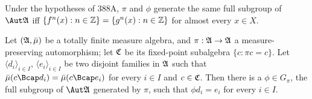      
Under the hypotheses of 388A, $\pi$ and $\phi$
generate the same full subgroup of $\Aut\frak A$ iff
$\{f^n(x):n\in\Bbb Z\}=\{g^n(x):n\in\Bbb Z\}$ for almost every $x\in X$.
     
 Let $(\frak A,\bar\mu)$ be a totally finite
measure algebra, and $\pi:\frak A\to\frak A$ a measure-preserving
automorphism;  let $\frak C$ be its fixed-point subalgebra
$\{c:\pi c=c\}$.
Let $\langle d_i\rangle_{i\in I}$, $\langle e_i\rangle_{i\in I}$ be two
disjoint families in $\frak A$ such that
$\bar\mu(c\Bcap d_i)=\bar\mu(c\Bcap e_i)$ for every $i\in I$ and
$c\in\frak C$.   Then there is a $\phi\in G_{\pi}$, the full subgroup of
$\Aut\frak A$ generated by $\pi$, such that $\phi d_i=e_i$ for every
$i\in I$.
     
